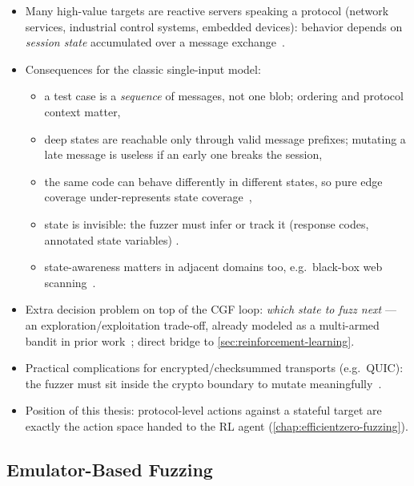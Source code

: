\begin{itemize}
  \item Many high-value targets are reactive servers speaking a protocol (network services,
    industrial control systems, embedded devices): behavior depends on \emph{session state}
    accumulated over a message exchange~\cite{ang_quic-fuzz_2025,borcherding_bandits_2023}.
  \item Consequences for the classic single-input model:
    \begin{itemize}
      \item a test case is a \emph{sequence} of messages, not one blob; ordering and protocol
        context matter,
      \item deep states are reachable only through valid message prefixes; mutating a late message
        is useless if an early one breaks the session,
      \item the same code can behave differently in different states, so pure edge coverage
        under-represents state coverage~\cite{borcherding_bandits_2023},
      \item state is invisible: the fuzzer must infer or track it (response codes, annotated state
        variables) .
      \item state-awareness matters in adjacent domains too, e.g.\ black-box web
        scanning~\cite{doupe_enemy_2012}.
    \end{itemize}
  \item Extra decision problem on top of the CGF loop: \emph{which state to fuzz next} ---
    an exploration/exploitation trade-off, already modeled as a multi-armed bandit in prior
    work~\cite{borcherding_bandits_2023}; direct bridge to \cref{sec:reinforcement-learning}.
  \item Practical complications for encrypted/checksummed transports (e.g.\ QUIC): the fuzzer must
    sit inside the crypto boundary to mutate meaningfully~\cite{ang_quic-fuzz_2025}.
  \item Position of this thesis: protocol-level actions against a stateful target are exactly the
    action space handed to the RL agent (\cref{chap:efficientzero-fuzzing}).
\end{itemize}

\subsection{Emulator-Based Fuzzing}\label{sec:fuzzing-emulation}


